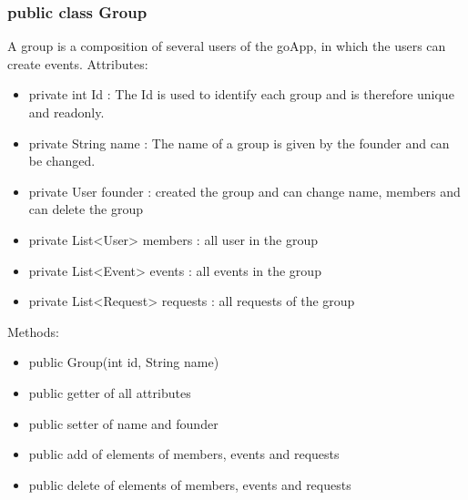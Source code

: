 	\subsubsection{public class Group}
	A group is a composition of several users of the goApp, in which the users can create events.
	\newline Attributes:
	\begin{itemize}
	\item private int Id : The Id is used to identify each group and is therefore unique and readonly.
	\item private String name : The name of a group is given by the founder and can be changed.
	\item private User founder : created the group and can change name, members and can delete the group
	\item private List<User> members : all user in the group
	\item private List<Event> events : all events in the group
	\item private List<Request> requests  : all requests of the group
	
	\end{itemize}
	Methods:
	\begin{itemize}
	\item public Group(int id, String name)
	\item public getter of all attributes
	\item public setter of name and founder
	\item public add of elements of members, events and requests
	\item public delete of elements of members, events and requests
	\end{itemize}

